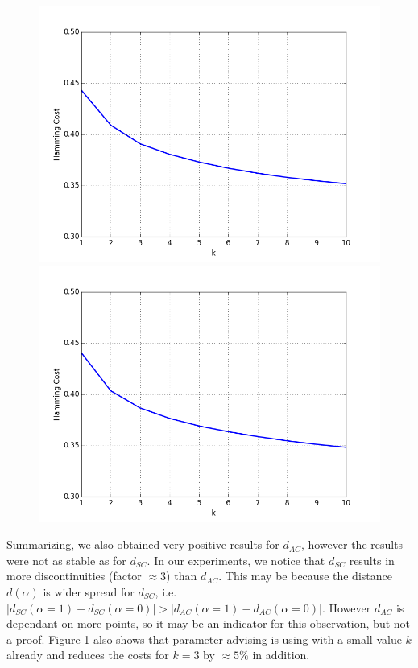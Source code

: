 \begin{figure}[H]
\centering
\begin{minipage}{.45\textwidth}
  \centering
  \includegraphics[width=\linewidth]{plots/mnist-ac-top-10}
\end{minipage}
\begin{minipage}{.45\textwidth}
  \centering
  \includegraphics[width=\linewidth]{plots/mnist-ac-random-top-10}
\end{minipage}
\caption{}
\label{fig:mnistactop10}
\end{figure}

Summarizing, we also obtained very positive results for $d_{AC}$, however the results were not as stable as for $d_{SC}$. In our experiments, we notice that $d_{SC}$ results in more discontinuities (factor $\approx 3$) than $d_{AC}$. This may be because the distance $d(\alpha)$ is wider spread for $d_{SC}$, i.e. $|d_{SC}(\alpha = 1) - d_{SC}(\alpha = 0)| > |d_{AC}(\alpha = 1) - d_{AC}(\alpha = 0)|$. However $d_{AC}$ is dependant on more points, so it may be an indicator for this observation, but not a proof. Figure \ref{fig:mnistactop10} also shows that parameter advising is using with a small value $k$ already and reduces the costs for $k = 3$ by $\approx 5\%$ in addition.


